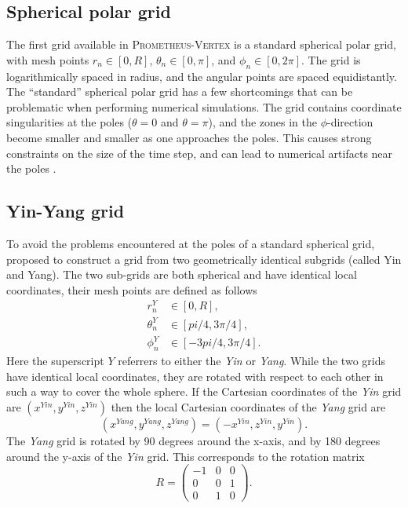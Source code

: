 \subsection{Spherical polar grid}
The first grid available in \textsc{Prometheus-Vertex} is a standard spherical polar grid, 
with mesh points $r_n \in [0, R]$, $\theta_n \in [0, \pi]$, and $\phi_n \in [0, 2\pi]$.
The grid is logarithmically spaced in radius, and the angular points are spaced equidistantly.  
The ``standard'' spherical polar grid has a few shortcomings that
can be problematic when performing numerical simulations. 
The grid contains coordinate singularities at the poles ($\theta = 0$ and $\theta = \pi$),
and the zones in the $\phi$-direction become smaller and smaller as one approaches the poles. 
This causes strong constraints on the size of the time step, and
can lead to numerical artifacts near the poles \citep{wongwathanarat_10a,mueller_15b}.

\subsection{Yin-Yang grid}
To avoid the problems encountered at the poles of a standard spherical grid, \cite{kageyama_04} proposed to
construct a grid from two geometrically identical subgrids (called Yin and Yang). 
The two sub-grids are both spherical and have identical local coordinates, their mesh points are defined as follows
\begin{align}
r_n^{Y} &\in [0, R], \\
\theta_n^{Y} &\in [pi/4, 3\pi/4], \\
\phi_n^{Y} &\in [-3pi/4, 3\pi/4].
\end{align} 
Here the superscript $Y$ referrers to either the \textit{Yin} or \textit{Yang}. While the two grids
have identical local coordinates, they are rotated with respect to each other in such a way
to cover the whole sphere. If 
the Cartesian coordinates of the \textit{Yin} grid are $(x^{Yin},y^{Yin},z^{Yin})$
then the local Cartesian coordinates of the \textit{Yang} grid are
\begin{equation}
(x^{Yang},y^{Yang},z^{Yang}) = (-x^{Yin},z^{Yin},y^{Yin}).
\end{equation} 
The \textit{Yang} grid is rotated by 90 degrees around the x-axis,
and by 180 degrees around the y-axis of the \textit{Yin} grid. 
This corresponds to the rotation matrix
\begin{equation} \label{eqT:pij}
R = 
  \begin{pmatrix}
    -1 & 0 & 0  \\
    0 & 0 & 1 \\
    0 & 1 & 0
  \end{pmatrix}.
\end{equation}


